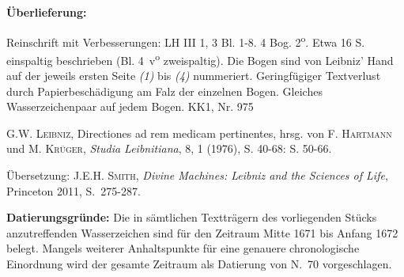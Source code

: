 \begin{ledgroupsized}[r]{120mm}%
\footnotesize %
\pstart%
\noindent\textbf{\"{U}berlieferung:}%
\pend%
\end{ledgroupsized}%
\begin{ledgroupsized}[r]{114mm}%
\footnotesize%
\pstart%
\parindent -6mm%
%
Reinschrift mit Verbesserungen:
LH III 1, 3 Bl. 1-8.
4 Bog. 2\textsuperscript{o}.
Etwa 16 S. einspaltig beschrieben (Bl. 4~v\textsuperscript{o} zweispaltig).
Die Bogen sind von Leibniz' Hand auf der jeweils ersten Seite \textit{(1)} bis \textit{(4)} nummeriert.
Geringf\"{u}giger Textverlust durch Papierbeschädigung am Falz der einzelnen Bogen. %
Gleiches Wasserzeichenpaar auf jedem Bogen.%
\newline%
KK1, Nr. 975%
\pend%
\end{ledgroupsized}%
\begin{ledgroupsized}[r]{114mm}%
\footnotesize%
\pstart%
\parindent -6mm%
%
\cite{01131}\textsc{G.W. Leibniz}, \glqq Directiones ad rem medicam pertinentes\grqq, hrsg. von \textsc{F. Hartmann} und \textsc{M. Kr\"{u}ger}, \textit{Studia Leibnitiana}, 8, 1 (1976), S. 40-68: S. 50-66.
\pend%
\end{ledgroupsized}%
\begin{ledgroupsized}[r]{114mm}%
\footnotesize%
\pstart%
\parindent -6mm%
\"{U}bersetzung: \cite{01132}\textsc{J.E.H. Smith}, \textit{Divine Machines: Leibniz and the Sciences of Life}, Princeton 2011, S.~275-287.
\pend%
\end{ledgroupsized}%
%
\vspace*{5mm}%
\begin{ledgroup}%
\footnotesize%
\pstart%
\noindent%
\footnotesize{%
\textbf{Datierungsgr\"{u}nde:}
Die in sämtlichen Textträgern des vorliegenden Stücks %
anzutreffenden Wasserzeichen sind für den Zeitraum Mitte 1671 bis Anfang 1672 belegt.
Mangels weiterer Anhaltspunkte für eine genauere chronologische Einordnung wird der gesamte Zeitraum als Datierung von N.~70 %
vorgeschlagen.
}%
\pend%
\end{ledgroup}%
%
%
\vspace{6mm}%
\pstart
\noindent
[1~r\textsuperscript{o}]
\pend
\pstart%
